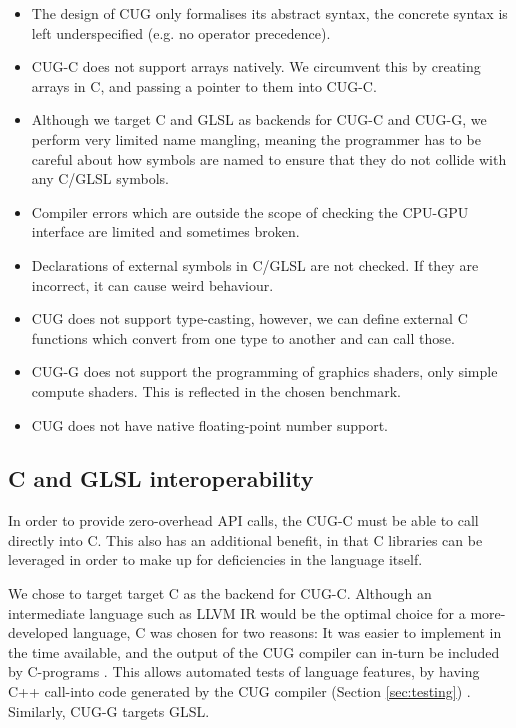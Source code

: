 \documentclass[a4paper,12pt,twoside,openright]{report}
\begin{document}
\begin{itemize}

    \item The design of CUG only formalises its abstract syntax, the concrete
    syntax is left underspecified (e.g. no operator precedence).

    \item CUG-C does not support arrays natively. We circumvent this by
    creating arrays in C, and passing a pointer to them into CUG-C.

    \item Although we target C and GLSL as backends for CUG-C and CUG-G, we
    perform very limited name mangling, meaning the programmer has to be
    careful about how symbols are named to ensure that they do not collide with
    any C/GLSL symbols.

    \item Compiler errors which are outside the scope of checking the CPU-GPU
    interface are limited and sometimes broken.

    \item Declarations of external symbols in C/GLSL are not checked. If they are
    incorrect, it can cause weird behaviour.

    \item CUG does not support type-casting, however, we can define external C
    functions which convert from one type to another and can call those.

    \item CUG-G does not support the programming of graphics shaders, only
    simple compute shaders. This is reflected in the chosen benchmark.

    \item CUG does not have native floating-point number support.

\end{itemize}

\subsection{C and GLSL interoperability}

In order to provide zero-overhead API calls, the CUG-C must be able to call
directly into C. This also has an additional benefit, in that C libraries can
be leveraged in order to make up for deficiencies in the language itself.

We chose to target target C as the backend for CUG-C. Although an intermediate
language such as LLVM IR would be the optimal choice for a more-developed
language, C was chosen for two reasons: It was easier to implement in the time
available, and the output of the CUG compiler can in-turn be included by
C-programs \cite{ProjectSource}. This allows automated tests of language
features, by having C++ call-into code generated by the CUG compiler (Section
\ref{sec:testing}) \cite{AutomatedTestCode} \cite{AutomatedTestOutput}.
Similarly, CUG-G targets GLSL.
\end{document}
